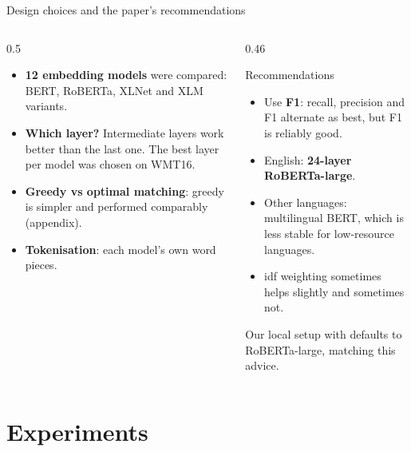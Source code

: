 \documentclass[aspectratio=169,11pt]{beamer}
\begin{document}
\begin{frame}{Design choices and the paper's recommendations}
  \begin{columns}[T]
    \begin{column}{0.5\textwidth}
      \small
      \begin{itemize}
        \item \textbf{12 embedding models} were compared: BERT, RoBERTa, XLNet and XLM variants.
        \item \textbf{Which layer?} Intermediate layers work better than the last one. The best layer per model was chosen on WMT16.
        \item \textbf{Greedy vs optimal matching}: greedy is simpler and performed comparably (appendix).
        \item \textbf{Tokenisation}: each model's own word pieces.
      \end{itemize}
    \end{column}
    \begin{column}{0.46\textwidth}
      \begin{exampleblock}{Recommendations}
        \small
        \begin{itemize}
          \item Use \textbf{F1}: recall, precision and F1 alternate as best, but F1 is reliably good.
          \item English: \textbf{24-layer RoBERTa-large}.
          \item Other languages: multilingual BERT, which is less stable for low-resource languages.
          \item idf weighting sometimes helps slightly and sometimes not.
        \end{itemize}
      \end{exampleblock}
      \begin{block}{Our local setup}
        \small
         with  defaults to RoBERTa-large, matching this advice.
      \end{block}
    \end{column}
  \end{columns}
\end{frame}

\section{Experiments}
\end{document}
